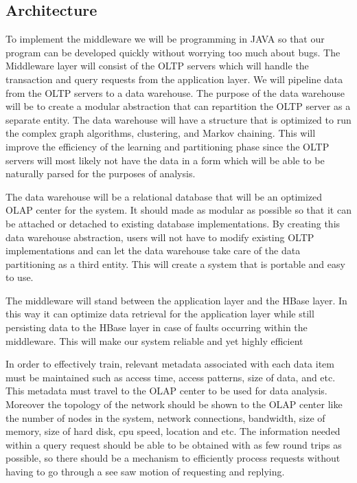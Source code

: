 \documentclass[10pt,final,journal]{IEEEtran}
\begin{document}
\subsection{Architecture}
To implement the middleware we will be programming in JAVA so that our program can be developed quickly without worrying too much about bugs.  The Middleware layer will consist of the OLTP servers which will handle the transaction and query requests from the application layer.  We will pipeline data from the OLTP servers to a data warehouse.  The purpose of the data warehouse will be to create a modular abstraction that can repartition the OLTP server as a separate entity.  The data warehouse will have a structure that is optimized to run the complex graph algorithms, clustering, and Markov chaining.  This will improve the efficiency of the learning and partitioning phase since the OLTP servers will most likely not have the data in a form which will be able to be naturally parsed for the purposes of analysis.

The data warehouse will be a relational database that will be an optimized OLAP center for the system.  It should made as modular as possible so that it can be attached or detached to existing database implementations.  By creating this data warehouse abstraction, users will not have to modify existing OLTP implementations and can let the data warehouse take care of the data partitioning as a third entity.  This will create a system that is portable and easy to use.

The middleware will stand between the application layer and the HBase layer.  In this way it can optimize data retrieval for the application layer while still persisting data to the HBase layer in case of faults occurring within the middleware.  This will make our system reliable and yet highly efficient

In order to effectively train, relevant metadata associated with each data item must be maintained such as access time, access patterns, size of data, and etc.  This metadata must travel to the OLAP center to be used for data analysis.  Moreover the topology of the network should be shown to the OLAP center like the number of nodes in the system, network connections, bandwidth, size of memory, size of hard disk, cpu speed, location and etc.  The information needed within a query request should be able to be obtained with as few round trips as possible, so there should be a mechanism to efficiently process requests without having to go through a see saw motion of requesting and replying.
\end{document}

